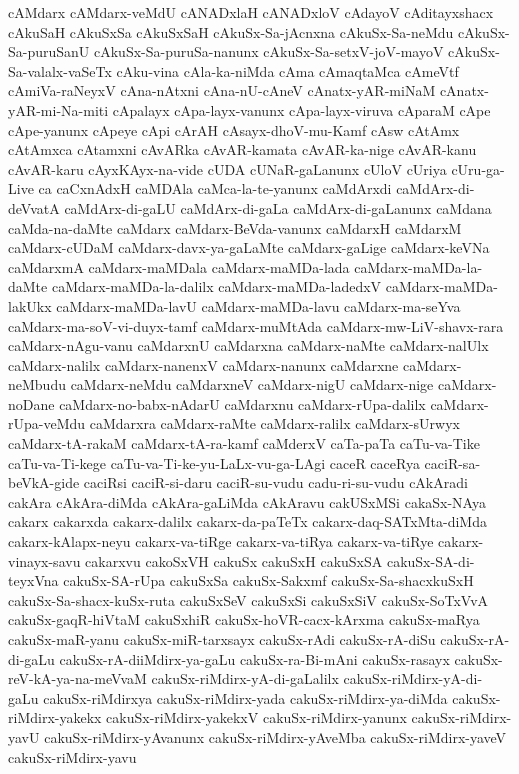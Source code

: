 {cAMdarx
cAMdarx-veMdU
cANADxlaH
cANADxloV
cAdayoV
cAditayxshacx
cAkuSaH
cAkuSxSa
cAkuSxSaH
cAkuSx-Sa-jAcnxna
cAkuSx-Sa-neMdu
cAkuSx-Sa-puruSanU
cAkuSx-Sa-puruSa-nanunx
cAkuSx-Sa-setxV-joV-mayoV
cAkuSx-Sa-valalx-vaSeTx
cAku-vina
cAla-ka-niMda
cAma
cAmaqtaMca
cAmeVtf
cAmiVa-raNeyxV
cAna-nAtxni
cAna-nU-cAneV
cAnatx-yAR-miNaM
cAnatx-yAR-mi-Na-miti
cApalayx
cApa-layx-vanunx
cApa-layx-viruva
cAparaM
cApe
cApe-yanunx
cApeye
cApi
cArAH
cAsayx-dhoV-mu-Kamf
cAsw
cAtAmx
cAtAmxca
cAtamxni
cAvARka
cAvAR-kamata
cAvAR-ka-nige
cAvAR-kanu
cAvAR-karu
cAyxKAyx-na-vide
cUDA
cUNaR-gaLanunx
cUloV
cUriya
cUru-ga-Live
ca
caCxnAdxH
caMDAla
caMca-la-te-yanunx
caMdArxdi
caMdArx-di-deVvatA
caMdArx-di-gaLU
caMdArx-di-gaLa
caMdArx-di-gaLanunx
caMdana
caMda-na-daMte
caMdarx
caMdarx-BeVda-vanunx
caMdarxH
caMdarxM
caMdarx-cUDaM
caMdarx-davx-ya-gaLaMte
caMdarx-gaLige
caMdarx-keVNa
caMdarxmA
caMdarx-maMDala
caMdarx-maMDa-lada
caMdarx-maMDa-la-daMte
caMdarx-maMDa-la-dalilx
caMdarx-maMDa-ladedxV
caMdarx-maMDa-lakUkx
caMdarx-maMDa-lavU
caMdarx-maMDa-lavu
caMdarx-ma-seYva
caMdarx-ma-soV-vi-duyx-tamf
caMdarx-muMtAda
caMdarx-mw-LiV-shavx-rara
caMdarx-nAgu-vanu
caMdarxnU
caMdarxna
caMdarx-naMte
caMdarx-nalUlx
caMdarx-nalilx
caMdarx-nanenxV
caMdarx-nanunx
caMdarxne
caMdarx-neMbudu
caMdarx-neMdu
caMdarxneV
caMdarx-nigU
caMdarx-nige
caMdarx-noDane
caMdarx-no-babx-nAdarU
caMdarxnu
caMdarx-rUpa-dalilx
caMdarx-rUpa-veMdu
caMdarxra
caMdarx-raMte
caMdarx-ralilx
caMdarx-sUrwyx
caMdarx-tA-rakaM
caMdarx-tA-ra-kamf
caMderxV
caTa-paTa
caTu-va-Tike
caTu-va-Ti-kege
caTu-va-Ti-ke-yu-LaLx-vu-ga-LAgi
caceR
caceRya
caciR-sa-beVkA-gide
caciRsi
caciR-si-daru
caciR-su-vudu
cadu-ri-su-vudu
cAkAradi
cakAra
cAkAra-diMda
cAkAra-gaLiMda
cAkAravu
cakUSxMSi
cakaSx-NAya
cakarx
cakarxda
cakarx-dalilx
cakarx-da-paTeTx
cakarx-daq-SATxMta-diMda
cakarx-kAlapx-neyu
cakarx-va-tiRge
cakarx-va-tiRya
cakarx-va-tiRye
cakarx-vinayx-savu
cakarxvu
cakoSxVH
cakuSx
cakuSxH
cakuSxSA
cakuSx-SA-di-teyxVna
cakuSx-SA-rUpa
cakuSxSa
cakuSx-Sakxmf
cakuSx-Sa-shacxkuSxH
cakuSx-Sa-shacx-kuSx-ruta
cakuSxSeV
cakuSxSi
cakuSxSiV
cakuSx-SoTxVvA
cakuSx-gaqR-hiVtaM
cakuSxhiR
cakuSx-hoVR-cacx-kArxma
cakuSx-maRya
cakuSx-maR-yanu
cakuSx-miR-tarxsayx
cakuSx-rAdi
cakuSx-rA-diSu
cakuSx-rA-di-gaLu
cakuSx-rA-diiMdirx-ya-gaLu
cakuSx-ra-Bi-mAni
cakuSx-rasayx
cakuSx-reV-kA-ya-na-meVvaM
cakuSx-riMdirx-yA-di-gaLalilx
cakuSx-riMdirx-yA-di-gaLu
cakuSx-riMdirxya
cakuSx-riMdirx-yada
cakuSx-riMdirx-ya-diMda
cakuSx-riMdirx-yakekx
cakuSx-riMdirx-yakekxV
cakuSx-riMdirx-yanunx
cakuSx-riMdirx-yavU
cakuSx-riMdirx-yAvanunx
cakuSx-riMdirx-yAveMba
cakuSx-riMdirx-yaveV
cakuSx-riMdirx-yavu
}
